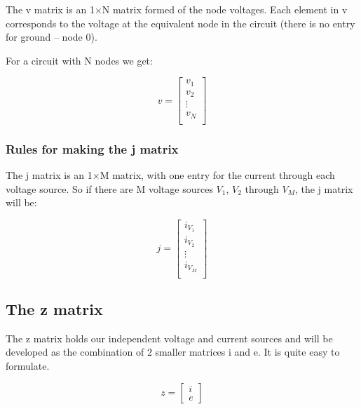 The v matrix is an 1$\times$N matrix formed of the node voltages.
Each element in v corresponds to the voltage at the equivalent node in
the circuit (there is no entry for ground -- node 0).

\addvspace{12pt}

For a circuit with N nodes we get:

\begin{equation}
v =
\begin{bmatrix}
v_{1}\\
v_{2}\\
\vdots\\
v_{N}\\
\end{bmatrix}
\end{equation}

\subsubsection{Rules for making the j matrix}

The j matrix is an 1$\times$M matrix, with one entry for the current
through each voltage source.  So if there are M voltage sources
$V_{1}$, $V_{2}$ through $V_{M}$, the j matrix will be:

\begin{equation}
j =
\begin{bmatrix}
i_{V_{1}}\\
i_{V_{2}}\\
\vdots\\
i_{V_{M}}\\
\end{bmatrix}
\end{equation}

\subsection{The z matrix}

The z matrix holds our independent voltage and current sources and
will be developed as the combination of 2 smaller matrices i and e.
It is quite easy to formulate.

\begin{equation}
z =
\begin{bmatrix}
i\\
e
\end{bmatrix}
\end{equation}

